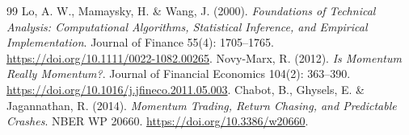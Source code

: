 \begin{thebibliography}{99}
 Lo, A. W., Mamaysky, H. \& Wang, J. (2000). \emph{Foundations of Technical Analysis: Computational Algorithms, Statistical Inference, and Empirical Implementation}. Journal of Finance 55(4): 1705--1765. \href{https://doi.org/10.1111/0022-1082.00265}{https://doi.org/10.1111/0022-1082.00265}.
 Novy-Marx, R. (2012). \emph{Is Momentum Really Momentum?}. Journal of Financial Economics 104(2): 363--390. \href{https://doi.org/10.1016/j.jfineco.2011.05.003}{https://doi.org/10.1016/j.jfineco.2011.05.003}.
 Chabot, B., Ghysels, E. \& Jagannathan, R. (2014). \emph{Momentum Trading, Return Chasing, and Predictable Crashes}. NBER WP 20660. \href{https://doi.org/10.3386/w20660}{https://doi.org/10.3386/w20660}.
\end{thebibliography}

